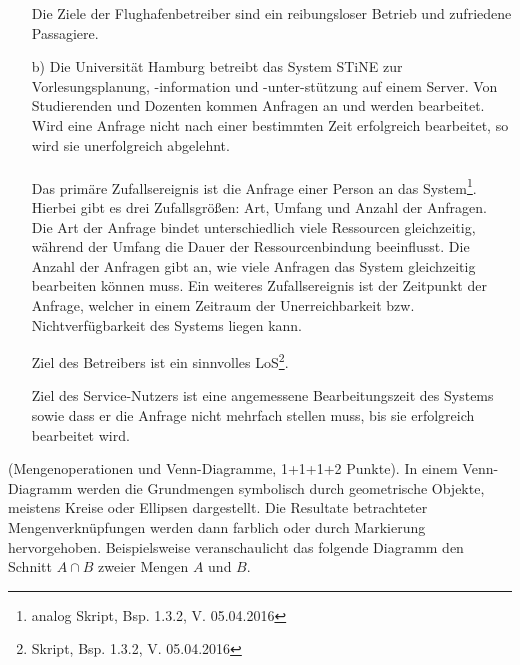 \documentclass[twoside]{article}
\begin{document}
\begin{enumerate}
	Die Ziele der Flughafenbetreiber sind ein reibungsloser Betrieb und zufriedene Passagiere.
	\item[b)]
	Die Universität Hamburg betreibt das System STiNE zur Vorlesungsplanung, -information und -unter-stützung auf einem Server.
	Von Studierenden und Dozenten kommen Anfragen an und werden bearbeitet.
	Wird eine Anfrage nicht nach einer bestimmten Zeit erfolgreich bearbeitet, so wird sie unerfolgreich abgelehnt.\\
	\vspace{.5cm}\\
	Das primäre Zufallsereignis ist die Anfrage einer Person an das System\footnote{analog Skript, Bsp. 1.3.2, V. 05.04.2016}.
	Hierbei gibt es drei Zufallsgrößen: Art, Umfang und Anzahl der Anfragen.
	Die Art der Anfrage bindet unterschiedlich viele Ressourcen gleichzeitig, während der Umfang die Dauer der Ressourcenbindung beeinflusst.
	Die Anzahl der Anfragen gibt an, wie viele Anfragen das System gleichzeitig bearbeiten können muss.
	Ein weiteres Zufallsereignis ist der Zeitpunkt der Anfrage, welcher in einem Zeitraum der Unerreichbarkeit bzw. Nichtverfügbarkeit des Systems liegen kann.
	
	Ziel des Betreibers ist ein sinnvolles LoS\footnote{Skript, Bsp. 1.3.2, V. 05.04.2016}.
	
	Ziel des Service-Nutzers ist eine angemessene Bearbeitungszeit des Systems sowie dass er die Anfrage nicht mehrfach stellen muss, bis sie erfolgreich bearbeitet wird.
	
	
\end{enumerate}
%
%
(Mengenoperationen und Venn-Diagramme, 1+1+1+2 Punkte).
In einem Venn-Diagramm werden die Grundmengen symbolisch durch geometrische Objekte, meistens Kreise oder Ellipsen dargestellt.
Die Resultate betrachteter Mengenverknüpfungen werden
dann farblich oder durch Markierung hervorgehoben.
Beispielsweise veranschaulicht das folgende Diagramm den Schnitt $A \cap B$ zweier Mengen $A$ und $B$.
\begin{center}
\end{center}
\end{document}
